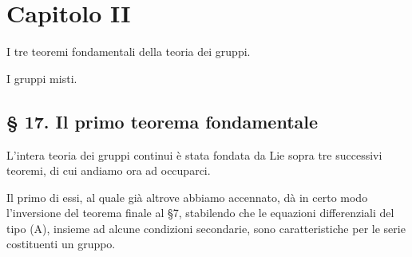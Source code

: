 \documentclass[11pt]{book}
\begin{document}
\chapter*{Capitolo II}

\begin{center}
\begin{minipage}{0.88\linewidth}
\centering
I tre teoremi fondamentali della teoria dei gruppi.\par
I gruppi misti.
\end{minipage}
\end{center}

\section*{\S{} 17. Il primo teorema fondamentale}

L'intera teoria dei gruppi continui è stata fondata da Lie sopra tre successivi teoremi, di cui andiamo ora ad occuparci.

Il primo di essi, al quale già altrove abbiamo accennato, dà in certo modo l'inversione del teorema finale al \S{}7, stabilendo che le equazioni differenziali del tipo (A), insieme ad alcune condizioni secondarie, sono caratteristiche per le serie costituenti un gruppo.
\end{document}
